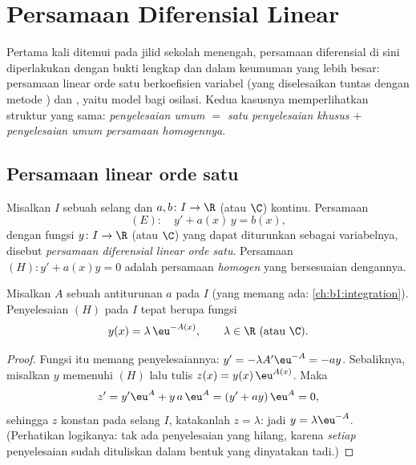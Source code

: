 \chapter{Persamaan Diferensial Linear}\label{ch:b1:diffeq}

Pertama kali ditemui pada jilid sekolah menengah, persamaan diferensial di sini
diperlakukan dengan bukti lengkap dan dalam keumuman yang lebih besar: persamaan
linear orde satu berkoefisien variabel (yang diselesaikan tuntas dengan
metode ) dan , yaitu model bagi osilasi. Kedua kasusnya memperlihatkan
struktur yang sama: \emph{penyelesaian umum $=$ satu penyelesaian khusus
$+$ penyelesaian umum persamaan homogennya}.

\section{Persamaan linear orde satu}

\begin{definition}\label{def:b1:diffeq:linear1}
Misalkan $I$ sebuah selang dan $a, b \colon I \to \R$ (atau $\C$)
kontinu. Persamaan
\[
(E)\colon\quad y' + a(x)\,y = b(x),
\]
dengan fungsi $y \colon I \to \R$ (atau $\C$) yang dapat diturunkan sebagai variabelnya,
disebut \emph{persamaan diferensial linear orde
satu}. Persamaan
$(H)\colon y' + a(x) y = 0$ adalah persamaan \emph{homogen}
yang bersesuaian dengannya.
\end{definition}

\begin{theorem}\label{thm:b1:diffeq:homogeneous1}
Misalkan $A$ sebuah antiturunan $a$ pada $I$ (yang memang ada:
\cref{ch:b1:integration}). Penyelesaian $(H)$ pada $I$ tepat
berupa fungsi
\[
y(x) = \lambda\, \eu^{-A(x)}, \qquad \lambda \in \R \text{ (atau } \C).
\]
\end{theorem}

\begin{proof}
Fungsi itu memang penyelesaiannya: $y' = -\lambda A' \eu^{-A} = -a y$.
Sebaliknya, misalkan $y$ memenuhi $(H)$ lalu tulis $z(x) = y(x)\, \eu^{A(x)}$.
Maka
\[
z' = y' \eu^{A} + y\, a\, \eu^{A} = (y' + ay)\, \eu^{A} = 0 ,
\]
sehingga $z$ konstan pada selang $I$, katakanlah $z = \lambda$: jadi $y =
\lambda \eu^{-A}$. (Perhatikan logikanya: tak ada penyelesaian yang hilang, karena
\emph{setiap} penyelesaian sudah dituliskan dalam bentuk yang dinyatakan tadi.)
\end{proof}


